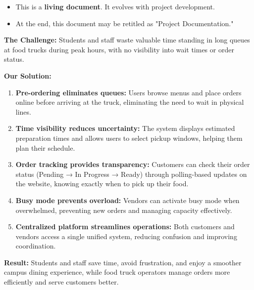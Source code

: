\documentclass[12pt,a4paper]{article}
\begin{document}
\begin{tcolorbox}[colback=yellow!10, colframe=orange!75!black, title=Important Note]
\begin{itemize}[leftmargin=1em]
    \item This is a \textbf{living document}. It evolves with project development.
    \item At the end, this document may be retitled as "Project Documentation."
\end{itemize}
\end{tcolorbox}

\vspace{1.5em}

\begin{tcolorbox}[colback=primaryblue!10, colframe=primaryblue, boxrule=1pt, arc=4pt, title=How the System Solves the Problem]

\textbf{The Challenge:} Students and staff waste valuable time standing in long queues at food trucks during peak hours, with no visibility into wait times or order status.

\vspace{0.5em}

\textbf{Our Solution:}

\begin{enumerate}[leftmargin=2em, itemsep=6pt]
    \item \textbf{Pre-ordering eliminates queues:} Users browse menus and place orders online before arriving at the truck, eliminating the need to wait in physical lines.
    
    \item \textbf{Time visibility reduces uncertainty:} The system displays estimated preparation times and allows users to select pickup windows, helping them plan their schedule.
    
    \item \textbf{Order tracking provides transparency:} Customers can check their order status (Pending → In Progress → Ready) through polling-based updates on the website, knowing exactly when to pick up their food.
    
    \item \textbf{Busy mode prevents overload:} Vendors can activate busy mode when overwhelmed, preventing new orders and managing capacity effectively.
    
    \item \textbf{Centralized platform streamlines operations:} Both customers and vendors access a single unified system, reducing confusion and improving coordination.
\end{enumerate}

\vspace{0.5em}

\textbf{Result:} Students and staff save time, avoid frustration, and enjoy a smoother campus dining experience, while food truck operators manage orders more efficiently and serve customers better.

\end{tcolorbox}
\end{document}
